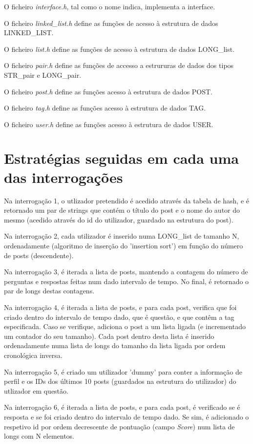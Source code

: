 \documentclass[10pt]{report}
\begin{document}
O ficheiro \textit{interface.h}, tal como o nome indica, implementa a interface.

O ficheiro \textit{linked\_list.h} define as funções de acesso à estrutura de dados LINKED\_LIST.

O ficheiro \textit{list.h} define as funções de acesso à estrutura de dados LONG\_list.

O ficheiro \textit{pair.h} define as funções de accesso a estrururas de dados dos tipos STR\_pair e LONG\_pair.

O ficheiro \textit{post.h} define as funções acesso à estrutura de dados POST.

O ficheiro \textit{tag.h} define as funções acesso à estrutura de dados TAG.

O ficheiro \textit{user.h} define as funções acesso à estrutura de dados USER.

\section{Estratégias seguidas em cada uma das interrogações}

Na interrogação 1, o utlizador pretendido é acedido através da tabela de hash, e é retornado um par de strings que contém o título do post e o nome do autor do mesmo (acedido através do id do utilizador, guardado na estrutura do post).

Na interrogação 2, cada utilizador é inserido numa LONG\_list de tamanho N, ordenadamente (algoritmo de inserção do 'insertion sort') em função do número de posts (descendente).

Na interrogação 3, é iterada a lista de posts, mantendo a contagem do número de perguntas e respostas feitas num dado intervalo de tempo. No final, é retornado o par de longs destas contagens.

Na interrogação 4, é iterada a lista de posts, e para cada post, verifica que foi criado dentro do intervalo de tempo dado, que é questão, e que contêm a tag especificada. Caso se verifique, adiciona o post a um lista ligada (e incrementado um contador do seu tamanho). Cada post dentro desta lista é inserido ordenadamente numa lista de longs do tamanho da lista ligada por ordem cronológica inversa.

Na interrogação 5, é criado um utilizador 'dummy' para conter a informação de perfil e os IDs dos últimos 10 posts (guardados na estrutura do utilizador) do utlizador em questão.

Na interrogação 6, é iterada a lista de posts, e para cada post, é verificado se é resposta e se foi criado dentro do intervalo de tempo dado. Se sim, é adicionado o respetivo id por ordem decrescente de pontuação (campo \textit{Score}) num lista de longs com N elementos.
\end{document}
